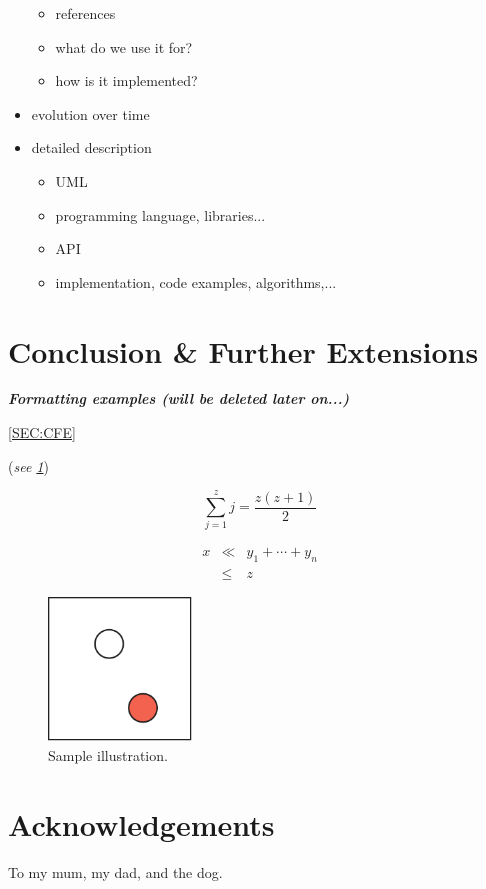 \documentclass[conference]{acmsiggraph}
\begin{document}
\begin{itemize}
{\begin{itemize}
{\begin{itemize}
		\item references
		\item what do we use it for?
		\item how is it implemented?
		\end{itemize}
	}
	\end{itemize}
}
\item evolution over time
\item{
	detailed description
	\begin{itemize}
	\item UML
	\item programming language, libraries...
	\item API
	\item implementation, code examples, algorithms,...
	\end{itemize}
}
\end{itemize}

\section{Conclusion \& Further Extensions}





\textit{\textbf{Formatting examples (will be deleted later on...)}}

\cref{SEC:CFE}\\

(\textit{see \cref{FIG:SAMPLE}})

\label{SEC:CFE}

\begin{equation}
 \sum_{j=1}^{z} j = \frac{z(z+1)}{2}
\end{equation}

\begin{eqnarray}
x & \ll & y_{1} + \cdots + y_{n} \\
  & \leq & z
\end{eqnarray}

\begin{figure}[ht]
  \centering
  \includegraphics[width=1.5in]{images/samplefigure}
  \caption{Sample illustration.}
  \label{FIG:SAMPLE}
\end{figure}

\section*{Acknowledgements}

To my mum, my dad, and the dog. 



\end{document}
